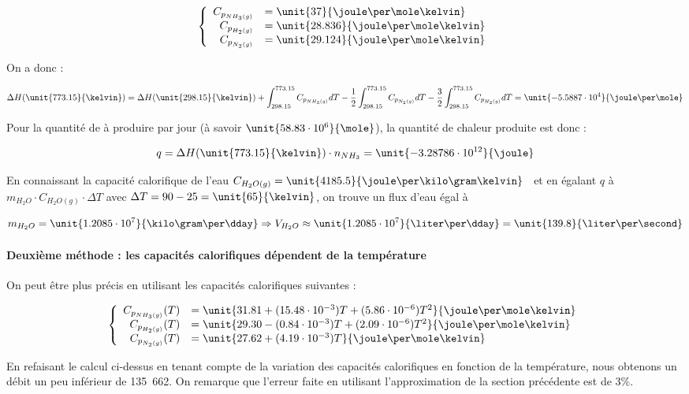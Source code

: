 	$$
	\left\{
		\begin{array}{rl}
			C_{p_{NH_3(g)}} &= \unit{37}{\joule\per\mole\kelvin}\\
			C_{p_{H_2(g)}} 	&= \unit{28.836}{\joule\per\mole\kelvin}\\
			C_{p_{N_2(g)}} 	&= \unit{29.124}{\joule\per\mole\kelvin}
		\end{array}
	\right.
	$$

On a donc :

$$\Delta H(\unit{773.15}{\kelvin}) = \Delta H(\unit{298.15}{\kelvin})
+ \int_{298.15}^{773.15} C_{p_{NH_3(g)}} dT - \frac{1}{2}\int_{298.15}^{773.15} C_{p_{N_2(g)}} dT
- \frac{3}{2} \int_{298.15}^{773.15} C_{p_{H_2(g)}} dT = \unit{-5.5887 \cdot 10^4}{\joule\per\mole}$$

Pour la quantité de  à produire par jour 
(à savoir $\unit{58.83 \cdot 10^6}{\mole}$),
la quantité de chaleur produite est donc :

$$q = \Delta H(\unit{773.15}{\kelvin}) \cdot n_{NH_3} = \unit{-3.28786 \cdot 10^{12}}{\joule}$$

En connaissant la capacité calorifique de l'eau $C_{H_2O(g)} =
\unit{4185.5}{\joule\per\kilo\gram\kelvin}$ ~\cite{atkins}et en égalant
$q$ à $m_{H_2O} \cdot C_{H_2O(g)} \cdot \Delta T$ avec 
$\Delta T = 90 - 25 = \unit{65}{\kelvin}$, on trouve un
flux d'eau égal à

$$m_{H_2O} = \unit{1.2085 \cdot 10^7}{\kilo\gram\per\dday} \Rightarrow V_{H_2O} \approx \unit{1.2085 \cdot 10^7}{\liter\per\dday} 
= \unit{139.8}{\liter\per\second}$$

\paragraph{Deuxième méthode : les capacités calorifiques dépendent de la température}
On peut être plus précis en utilisant les capacités calorifiques suivantes \cite{hc-table} :

	$$
	\left\{
		\begin{array}{rl}
			C_{p_{NH_3(g)}}(T) &= \unit{31.81 + (15.48 \cdot 10^{-3})T + (5.86 \cdot 10^{-6})T^2}{\joule\per\mole\kelvin}\\
			C_{p_{H_2(g)}}(T) 	&= \unit{29.30 - (0.84 \cdot 10^{-3})T + (2.09 \cdot 10^{-6})T^2}{\joule\per\mole\kelvin}\\
			C_{p_{N_2(g)}}(T) 	&= \unit{27.62 + (4.19 \cdot 10^{-3})T}{\joule\per\mole\kelvin}
		\end{array}
	\right.
	$$

En refaisant le calcul ci-dessus en tenant compte de la variation des capacités
calorifiques en fonction
de la température, nous obtenons un débit un peu inférieur 
de \unit{135.662}{\liter\per\second}. On remarque
que l'erreur faite en utilisant l'approximation de la section
précédente est de 3\%.


